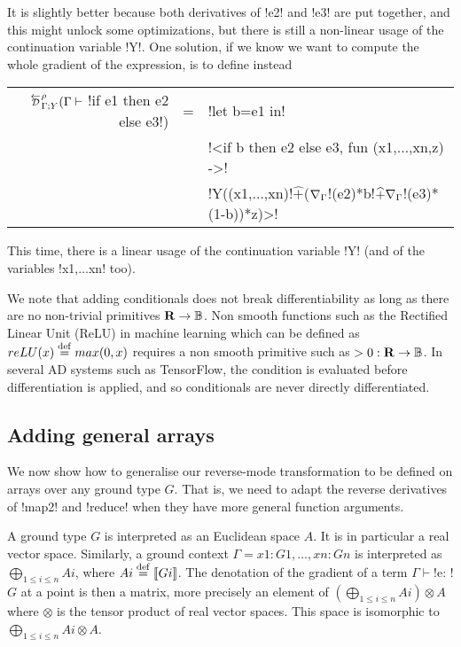 It is slightly better because both derivatives of !e2! and !e3! are put together, and this might unlock some optimizations, 
but there is still a non-linear usage of the continuation variable !Y!.
One solution, if we know we want to compute the whole gradient of the expression, is to define instead

\begin{tabular}{r c l}
    $\directD{\rho}{\Gamma}{Y}(\Gamma \vdash$ !if e1 then e2 else e3!) 
    &=& !let b=e1 in!   \\
    && !<if b then e2 else e3, fun (x1,$\ldots$,xn,z) ->! \\
    && !Y((x1,$\ldots$,xn)!$\widehat{+}$($\nabla_\Gamma$!(e2)*b!$\widehat{+}\nabla_\Gamma$!(e3)*(1-b))*z)>!\\
\end{tabular}

This time, there is a linear usage of the continuation variable !Y! (and of the variables !x1,$\ldots$xn! too).

We note that adding conditionals does not break differentiability as long as there are no non-trivial primitives $\mathbf{R}\to\mathbb{B}$.
Non smooth functions such as the Rectified Linear Unit (ReLU) in machine learning which can be defined as $reLU(x)\stackrel {\mathrm{def}}= max(0,x)$ 
requires a non smooth primitive such as $>0: \mathbf{R}\to\mathbb{B}$. In several AD systems such as TensorFlow, 
the condition is evaluated before differentiation is applied, and so conditionals are never directly differentiated.

\subsection{Adding general arrays} %
\label{sub:Adding general arrays}

We now show how to generalise our reverse-mode transformation to be defined on arrays over any ground type $G$.
That is, we need to adapt the reverse derivatives of !map2! and !reduce! when they have more general function arguments.

A ground type $G$ is interpreted as an Euclidean space $A$. 
It is in particular a real vector space.
Similarly, a ground context $\Gamma=x1:G1,\ldots,xn:Gn$ is interpreted as $\bigoplus_{1\leq i\leq n}Ai$, where $Ai\stackrel {\mathrm{def}}=\llbracket Gi\rrbracket$.
The denotation of the gradient of a term $\Gamma \vdash$!e: !$G$ at a point is then a matrix, more precisely an element of $(\bigoplus_{1\leq i\leq n}Ai)\otimes A$
where $\otimes$ is the tensor product of real vector spaces. This space is isomorphic to $\bigoplus_{1\leq i\leq n}Ai\otimes A$.

